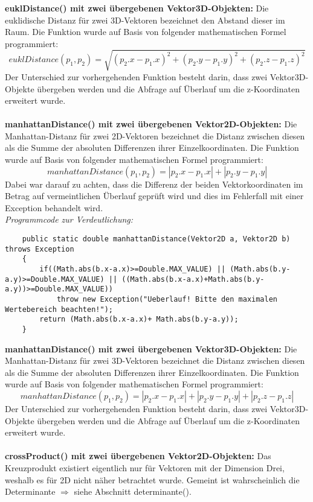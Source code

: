 \documentclass[a4paper,11pt]{scrartcl}
\begin{document}
\textbf{euklDistance() mit zwei übergebenen Vektor3D-Objekten:} Die euklidische Distanz für zwei 3D-Vektoren bezeichnet den Abstand dieser im Raum. Die Funktion wurde auf Basis von folgender mathematischen Formel programmiert:
\[ euklDistance(p_1,p_2) = \sqrt{(p_2.x - p_1.x)^2 + (p_2.y - p_1.y)^2 + (p_2.z - p_1.z)^2} \]
Der Unterschied zur vorhergehenden Funktion besteht darin, dass zwei Vektor3D-Objekte übergeben werden und die Abfrage auf Überlauf um die z-Koordinaten erweitert wurde.\\
\\
\textbf{manhattanDistance() mit zwei übergebenen Vektor2D-Objekten:} Die Manhattan-Distanz für zwei 2D-Vektoren bezeichnet die Distanz zwischen diesen als die Summe der absoluten Differenzen ihrer Einzelkoordinaten. Die Funktion wurde auf Basis von folgender mathematischen Formel programmiert:
\[ manhattanDistance(p_1,p_2) = | p_2.x - p_1.x | + | p_2.y - p_1.y | \]
Dabei war darauf zu achten, dass die Differenz der beiden Vektorkoordinaten im Betrag auf vermeintlichen Überlauf geprüft wird und dies im Fehlerfall mit einer Exception behandelt wird.\\
\textit{Programmcode zur Verdeutlichung:}
\begin{lstlisting}
	public static double manhattanDistance(Vektor2D a, Vektor2D b) throws Exception
	{
		if((Math.abs(b.x-a.x)>=Double.MAX_VALUE) || (Math.abs(b.y-a.y)>=Double.MAX_VALUE) || ((Math.abs(b.x-a.x)+Math.abs(b.y-a.y))>=Double.MAX_VALUE))
			throw new Exception("Ueberlauf! Bitte den maximalen Wertebereich beachten!");
		return (Math.abs(b.x-a.x)+ Math.abs(b.y-a.y));
	}
\end{lstlisting} $\;$ \\
\textbf{manhattanDistance() mit zwei übergebenen Vektor3D-Objekten:} Die Manhattan-Distanz für zwei 3D-Vektoren bezeichnet die Distanz zwischen diesen als die Summe der absoluten Differenzen ihrer Einzelkoordinaten. Die Funktion wurde auf Basis von folgender mathematischen Formel programmiert:
\[ manhattanDistance(p_1,p_2) = | p_2.x - p_1.x | + | p_2.y - p_1.y | + | p_2.z - p_1.z |\]
Der Unterschied zur vorhergehenden Funktion besteht darin, dass zwei Vektor3D-Objekte übergeben werden und die Abfrage auf Überlauf um die z-Koordinaten erweitert wurde.\\
\\
\textbf{crossProduct() mit zwei übergebenen Vektor2D-Objekten:} Das Kreuzprodukt existiert eigentlich nur für Vektoren mit der Dimension Drei, weshalb es für 2D nicht näher betrachtet wurde. Gemeint ist wahrscheinlich die Determinante $\Rightarrow$ siehe Abschnitt determinante().\\
\end{document}
